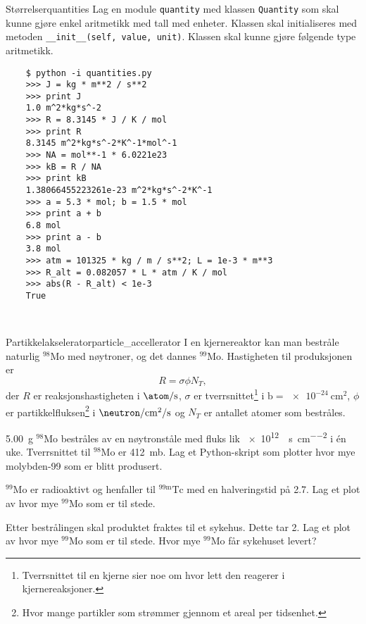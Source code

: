 \begin{exercise}{Størrelser}{quantities}
	Lag en module \texttt{quantity} med klassen \texttt{Quantity} som skal kunne gjøre enkel aritmetikk med tall med enheter. Klassen skal initialiseres med metoden \texttt{__init__(self, value, unit)}. Klassen skal kunne gjøre følgende type aritmetikk.\\
	
	\begin{verbatim}
	$ python -i quantities.py
	>>> J = kg * m**2 / s**2
	>>> print J
	1.0 m^2*kg*s^-2
	>>> R = 8.3145 * J / K / mol
	>>> print R
	8.3145 m^2*kg*s^-2*K^-1*mol^-1
	>>> NA = mol**-1 * 6.0221e23
	>>> kB = R / NA
	>>> print kB
	1.38066455223261e-23 m^2*kg*s^-2*K^-1
	>>> a = 5.3 * mol; b = 1.5 * mol
	>>> print a + b
	6.8 mol
	>>> print a - b
	3.8 mol
	>>> atm = 101325 * kg / m / s**2; L = 1e-3 * m**3
	>>> R_alt = 0.082057 * L * atm / K / mol
	>>> abs(R - R_alt) < 1e-3
	True
	\end{verbatim}
	\
\end{exercise}

\setcounter{chapter}{0}
\renewcommand\thechapter{\Alph{chapter}}

\setcounter{chapter}{4}

\exercisechapter

\begin{exercise}{Partikkelakselerator}{particle_accellerator}
	I en kjernereaktor kan man bestråle naturlig ${}^{98}\mathrm{Mo}$ med nøytroner, og det dannes ${}^{99}\mathrm{Mo}$. Hastigheten til produksjonen er 
	\begin{equation*}
		R=\sigma\phi N_T,
	\end{equation*}
	der $R$ er reaksjonshastigheten i $\si{\atom\per\second}$, $\sigma$ er tverrsnittet\footnote{Tverrsnittet til en kjerne sier noe om hvor lett den reagerer i kjernereaksjoner.} i $\si{\barn}=\SI{e-24}{\centi\meter\squared}$, $\phi$ er partikkelfluksen\footnote{Hvor mange partikler som strømmer gjennom et areal per tidsenhet.} i $\si{\neutron\per\centi\meter\squared\per\second}$ og $N_T$ er antallet atomer som bestråles.
	
	\subexercise \SI{5,00}{\gram} ${}^{98}\mathrm{Mo}$ bestråles av en nøytronståle med fluks lik \SI{e12}{\neutron\per\second\per\centi\meter\squared} i én uke. Tverrsnittet til ${}^{98}\mathrm{Mo}$ er \SI{412}{\milli\barn}. Lag et Python-skript som plotter hvor mye molybden-99 som er blitt produsert.
	
	\subexercise ${}^{99}\mathrm{Mo}$ er radioaktivt og henfaller til ${}^{99\mathrm{m}}\mathrm{Tc}$ med en halveringstid på \SI{2,7}{\days}. Lag et plot av hvor mye ${}^{99}\mathrm{Mo}$ som er til stede.
	
	\subexercise Etter bestrålingen skal produktet fraktes til et sykehus. Dette tar \SI{2}{\days}. Lag et plot av hvor mye ${}^{99}\mathrm{Mo}$ som er til stede. Hvor mye ${}^{99}\mathrm{Mo}$ får sykehuset levert?
\end{exercise}

